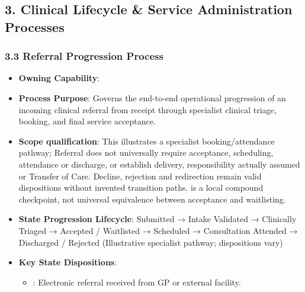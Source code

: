 \par\smallskip
{}\label{rad:processes:100}
\subsection*{3. Clinical Lifecycle \& Service Administration Processes}
\label{rad:processes:102}
\subsubsection*{3.3 Referral Progression Process}
\label{rad:processes:103}

\begin{itemize}

\item
\textbf{Owning Capability}: \texttt{}



\item
\textbf{Process Purpose}: Governs the end-to-end operational progression of an incoming clinical referral from receipt through specialist clinical triage, booking, and final service acceptance.



\item
\textbf{Scope qualification}: This illustrates a specialist booking/\allowbreak{}attendance pathway; Referral does not universally require acceptance, scheduling, attendance or discharge, or establish delivery, responsibility actually assumed or Transfer of Care. Decline, rejection and redirection remain valid dispositions without invented transition paths. \texttt{} is a local compound checkpoint, not universal equivalence between acceptance and waitlisting.



\item
\textbf{State Progression Lifecycle}: Submitted → Intake Validated → Clinically Triaged → Accepted /\allowbreak{} Waitlisted → Scheduled → Consultation Attended → Discharged /\allowbreak{} Rejected   (Illustrative specialist pathway; dispositions vary)



\item
\textbf{Key State Dispositions}:


\begin{itemize}

\item
\texttt{}: Electronic referral received from GP or external facility.




\end{itemize}
\end{itemize}
